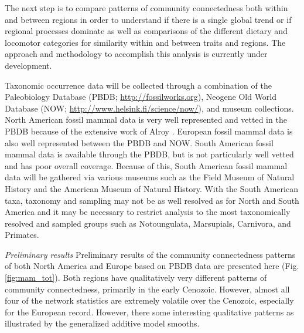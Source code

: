 \documentclass[12pt,letterpaper]{article}
\begin{document}
The next step is to compare patterns of community connectedness both within and between regions in order to understand if there is a single global trend or if regional processes dominate as well as comparisons of the different dietary and locomotor categories for similarity within and between traits and regions. The approach and methodology to accomplish this analysis is currently under development. 

Taxonomic occurrence data will be collected through a combination of the Paleobiology Database (PBDB; \url{http://fossilworks.org}), Neogene Old World Database (NOW; \url{http://www.helsink.fi/science/now/}), and museum collections. North American fossil mammal data is very well represented and vetted in the PBDB because of the extensive work of Alroy \citep{Alroy1996a,Alroy1998,Alroy2000g}. European fossil mammal data is also well represented between the PBDB and NOW. South American fossil mammal data is available through the PBDB, but is not particularly well vetted and has poor overall coverage. Because of this, South American fossil mammal data will be gathered via various museums such as the Field Museum of Natural History and the American Museum of Natural History. With the South American taxa, taxonomy and sampling may not be as well resolved as for North and South America and it may be necessary to restrict analysis to the most taxonomically resolved and sampled groups such as Notoungulata, Marsupials, Carnivora, and Primates.


\textit{Preliminary results}
Preliminary results of the community connectedness patterns of both North America and Europe based on PBDB data are presented here (Fig. \ref{fig:mam_tot}). Both regions have qualitatively very different patterns of community connectedness, primarily in the early Cenozoic. However, almost all four of the network statistics are extremely volatile over the Cenozoic, especially for the European record. However, there some interesting qualitative patterns as illustrated by the generalized additive model smooths.
\end{document}
